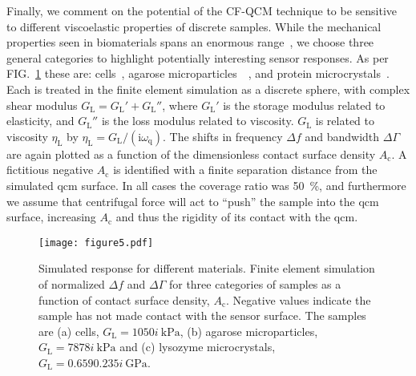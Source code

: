 \documentclass[floatfix,superscriptaddress,a4paper,twocolumn]{revtex4-1}
\newcommand{\Figure}[1]{FIG.~\ref{#1}}
\newcommand{\mi}{{\mathrm{i}}}
\newcommand{\df}{\Delta\!f}
\newcommand{\dg}{\Delta\Gamma}
\newcommand{\omegaq}{\omega_\mathrm{q}}
\begin{document}
Finally, we comment on the potential of the CF-QCM technique to be
sensitive to different viscoelastic properties of discrete samples.  While
the mechanical properties seen in biomaterials spans an enormous
range~\cite{meyers2008biological}, we choose three general categories to
highlight potentially interesting sensor responses.  As per
\Figure{fig:multisweep} these are: cells~\cite{li2008thickness}, agarose
microparticles~\cite{li2011surface}~\cite{patra2009viscoelastic}, and
protein microcrystals~\cite{zamiri2009modeling}.  Each is treated in the
finite element simulation as a discrete sphere, with complex shear modulus
$G_\mathrm{L}=G_\mathrm{L}'+G_\mathrm{L}''$, where $G_\mathrm{L}'$ is the
storage modulus related to elasticity, and $G_\mathrm{L}''$ is the loss
modulus related to viscosity.  $G_\mathrm{L}$ is related to viscosity
$\eta_\mathrm{L}$ by $\eta_\mathrm{L}=G_\mathrm{L}/(\mi\omegaq)$.  The
shifts in frequency $\df$ and bandwidth $\dg$ are again plotted as a function of
the dimensionless contact surface density $A_\mathrm{c}$.
A fictitious negative $A_\mathrm{c}$
is identified with a finite separation distance from the
simulated \gls{qcm} surface.  In all cases the coverage ratio was
\SI{50}{\percent}, and furthermore we assume that centrifugal force will act to
``push'' the sample into the \gls{qcm} surface, increasing $A_\mathrm{c}$ and
thus the rigidity of its contact with the \gls{qcm}.
\begin{figure}[ht]
  \centering
  \texttt{[image: figure5.pdf]}
  \caption{Simulated response for different materials.  Finite element simulation of normalized $\df$ and $\dg$ for three
    categories of samples as a function of contact surface density,
    $A_\mathrm{c}$.
    Negative values indicate the sample has not made contact with the sensor
    surface.
    The samples are (a) cells, $G_\mathrm{L}=\SI{10+50i}{\kilo\pascal}$, (b)
    agarose microparticles, $G_\mathrm{L}=\SI{78+78i}{\kilo\pascal}$ and (c) lysozyme
    microcrystals, $G_\mathrm{L}=\SI{0.659+0.235i}{\giga\pascal}$.  }
  \label{fig:multisweep}
\end{figure}
\end{document}
